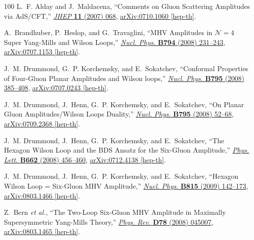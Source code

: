 \documentclass[12pt,hyperref,compress]{JHEP3}
\begin{document}
\begin{thebibliography}{100}
L.~F. Alday and J.~Maldacena, ``{Comments on Gluon Scattering Amplitudes via
  AdS/CFT},'' \href{http://dx.doi.org/10.1088/1126-6708/2007/11/068}{{\em JHEP}
  {\bf 11} (2007)  068},
\href{http://arxiv.org/abs/0710.1060}{{ arXiv:0710.1060 [hep-th]}}.

A.~Brandhuber, P.~Heslop, and G.~Travaglini, ``{MHV Amplitudes in
  $\mathcal{N}\!=\!4$ Super Yang-Mills and Wilson Loops},''
  \href{http://dx.doi.org/10.1016/j.nuclphysb.2007.11.002}{{\em Nucl. Phys.}
  {\bf B794} (2008)  231--243},
\href{http://arxiv.org/abs/0707.1153}{{ arXiv:0707.1153 [hep-th]}}.

J.~M. Drummond, G.~P. Korchemsky, and E.~Sokatchev, ``{Conformal Properties of
  Four-Gluon Planar Amplitudes and Wilson loops},''
  \href{http://dx.doi.org/10.1016/j.nuclphysb.2007.11.041}{{\em Nucl. Phys.}
  {\bf B795} (2008)  385--408},
\href{http://arxiv.org/abs/0707.0243}{{ arXiv:0707.0243 [hep-th]}}.

J.~M. Drummond, J.~Henn, G.~P. Korchemsky, and E.~Sokatchev, ``{On Planar Gluon
  Amplitudes/Wilson Loops Duality},''
  \href{http://dx.doi.org/10.1016/j.nuclphysb.2007.11.007}{{\em Nucl. Phys.}
  {\bf B795} (2008)  52--68},
\href{http://arxiv.org/abs/0709.2368}{{ arXiv:0709.2368 [hep-th]}}.

J.~M. Drummond, J.~Henn, G.~P. Korchemsky, and E.~Sokatchev, ``{The Hexagon
  Wilson Loop and the BDS Ansatz for the Six-Gluon Amplitude},''
  \href{http://dx.doi.org/10.1016/j.physletb.2008.03.032}{{\em Phys. Lett.}
  {\bf B662} (2008)  456--460},
\href{http://arxiv.org/abs/0712.4138}{{ arXiv:0712.4138 [hep-th]}}.

J.~M. Drummond, J.~Henn, G.~P. Korchemsky, and E.~Sokatchev, ``{Hexagon Wilson
  Loop = Six-Gluon MHV Amplitude},''
  \href{http://dx.doi.org/10.1016/j.nuclphysb.2009.02.015}{{\em Nucl. Phys.}
  {\bf B815} (2009)  142--173},
\href{http://arxiv.org/abs/0803.1466}{{ arXiv:0803.1466 [hep-th]}}.

Z.~Bern {\em et al.}, ``{The Two-Loop Six-Gluon MHV Amplitude in Maximally
  Supersymmetric Yang-Mills Theory},''
  \href{http://dx.doi.org/10.1103/PhysRevD.78.045007}{{\em Phys. Rev.} {\bf
  D78} (2008)  045007},
\href{http://arxiv.org/abs/0803.1465}{{ arXiv:0803.1465 [hep-th]}}.


\end{thebibliography}
\end{document}

